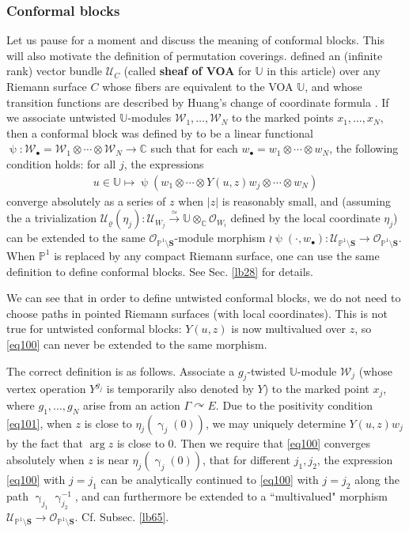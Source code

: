 \documentclass[12pt,a4paper,notitlepage]{article}
\theoremstyle{definition}
\theoremstyle{plain}
\newcommand{\mc}{\mathcal}
\newcommand{\scr}{\mathscr}
\newcommand{\blt}{\bullet}
\newcommand{\Ubb}{\mathbb U}
\newcommand{\Cbb}{\mathbb C}
\newcommand{\Pbb}{\mathbb P}
\newcommand{\Sbf}{\mathbf{S}}
\numberwithin{equation}{subsection}
\begin{document}
\subsubsection*{Conformal blocks}\label{lb67}

Let us pause for a moment and discuss the meaning of conformal blocks. This will also motivate the definition of permutation coverings. \cite{FB04} defined an (infinite rank) vector bundle $\scr U_C$ (called \textbf{sheaf of VOA} for $\Ubb$ in this article) over any Riemann surface $C$ whose fibers are equivalent to the VOA $\Ubb$, and whose transition functions are described by Huang's change of coordinate formula \cite{Hua97}. If we associate untwisted $\Ubb$-modules $\mc W_1,\dots,\mc W_N$ to the marked points $x_1,\dots,x_N$, then a conformal block was defined by \cite{FB04} to be a linear functional $\uppsi:\mc W_\blt=\mc W_1\otimes\cdots\otimes\mc W_N\rightarrow\Cbb$ such that for each $w_\blt=w_1\otimes\cdots\otimes w_N$, the following condition holds: for all $j$, the expressions 
\begin{align}
u\in\Ubb\mapsto\uppsi(w_1\otimes\cdots\otimes Y(u,z)w_j\otimes\cdots\otimes w_N)	\label{eq100}
\end{align}
converge absolutely as a series of $z$ when $|z|$ is reasonably small, and (assuming the a trivialization $\mc U_\varrho(\eta_j):\scr U_{W_j}\xrightarrow{\simeq}\Ubb\otimes_\Cbb\scr O_{W_i}$ defined by the local coordinate $\eta_j$) can be extended to the same $\scr O_{\Pbb^1\setminus\Sbf}$-module morphism $\wr\uppsi(\cdot,w_\blt):\scr U_{\Pbb^1\setminus\Sbf}\rightarrow\scr O_{\Pbb^1\setminus\Sbf}$. When $\Pbb^1$ is replaced by any compact Riemann surface, one can use the same definition to define conformal blocks. See Sec. \ref{lb28} for details.


We can see that in order  to define untwisted conformal blocks, we do not need to choose paths in pointed Riemann surfaces (with local coordinates). This is not true for untwisted conformal blocks: $Y(u,z)$ is now multivalued over $z$, so \eqref{eq100} can never be extended to the same morphism. 

The correct definition is as follows. Associate a $g_j$-twisted $\Ubb$-module $\mc W_j$ (whose vertex operation $Y^{g_j}$ is temporarily also denoted by $Y$) to the marked point $x_j$, where $g_1,\dots,g_N$ arise from an action $\Gamma\curvearrowright E$. Due to the positivity condition \eqref{eq101}, when $z$ is close to $\eta_j(\upgamma_j(0))$, we may uniquely determine $Y(u,z)w_j$ by the fact that $\arg z$ is close to $0$. Then we require that \eqref{eq100} converges absolutely when $z$ is near $\eta_j(\upgamma_j(0))$, that for different $j_1,j_2$, the expression \eqref{eq100} with $j=j_1$ can be analytically continued to \eqref{eq100} with $j=j_2$ along the path $\upgamma_{j_1}\upgamma_{j_2}^{-1}$, and  can furthermore be extended to a ``multivalued" morphism $\scr U_{\Pbb^1\setminus\Sbf}\rightarrow\scr O_{\Pbb^1\setminus\Sbf}$. Cf. Subsec. \ref{lb65}.
\end{document}
